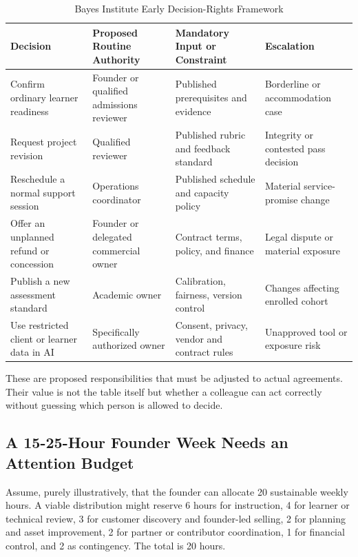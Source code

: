 \begin{table}[t]
\centering
\small
\caption{Bayes Institute Early Decision-Rights Framework}
\label{tab:bayes_early_decision_rights}
\begin{tabularx}{\textwidth}{p{3.8cm} p{3.6cm} p{4.2cm} X}
\toprule
\textbf{Decision} & \textbf{Proposed Routine Authority} & \textbf{Mandatory Input or Constraint} & \textbf{Escalation} \\
\midrule
Confirm ordinary learner readiness & Founder or qualified admissions reviewer & Published prerequisites and evidence & Borderline or accommodation case \\
Request project revision & Qualified reviewer & Published rubric and feedback standard & Integrity or contested pass decision \\
Reschedule a normal support session & Operations coordinator & Published schedule and capacity policy & Material service-promise change \\
Offer an unplanned refund or concession & Founder or delegated commercial owner & Contract terms, policy, and finance & Legal dispute or material exposure \\
Publish a new assessment standard & Academic owner & Calibration, fairness, version control & Changes affecting enrolled cohort \\
Use restricted client or learner data in AI & Specifically authorized owner & Consent, privacy, vendor and contract rules & Unapproved tool or exposure risk \\
\bottomrule
\end{tabularx}
\end{table}

These are proposed responsibilities that must be adjusted to actual agreements. Their value is not the table itself but whether a colleague can act correctly without guessing which person is allowed to decide.

\subsection{A 15-25-Hour Founder Week Needs an Attention Budget}
\label{sec:bayes_founder_attention_budget}

Assume, purely illustratively, that the founder can allocate 20 sustainable weekly hours. A viable distribution might reserve 6 hours for instruction, 4 for learner or technical review, 3 for customer discovery and founder-led selling, 2 for planning and asset improvement, 2 for partner or contributor coordination, 1 for financial control, and 2 as contingency. The total is 20 hours.

